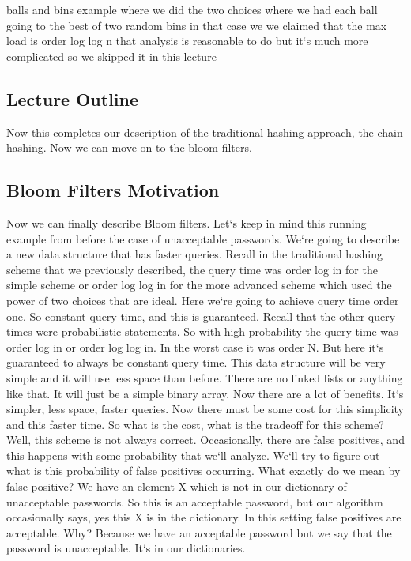 balls and bins example where we did the two choices where we had each ball going to the best of two random bins in that case we we claimed that the max load is order log log n that analysis is reasonable to do but it`s much more complicated so we skipped it in this lecture

\subsection{Lecture Outline}
Now this completes our description of the traditional hashing approach, the chain hashing.
Now we can move on to the bloom filters.

\subsection{Bloom Filters  Motivation}
Now we can finally describe Bloom filters.
Let`s keep in mind this running example from before the case of unacceptable passwords.
We`re going to describe a new data structure that has faster queries.
Recall in the traditional hashing scheme that we previously described, the query time was order log in for the simple scheme or order log log in for the more advanced scheme which used the power of two choices that are ideal.
Here we`re going to achieve query time order one.
So constant query time, and this is guaranteed.
Recall that the other query times were probabilistic statements.
So with high probability the query time was order log in or order log log in.
In the worst case it was order N\@.
But here it`s guaranteed to always be constant query time.
This data structure will be very simple and it will use less space than before.
There are no linked lists or anything like that.
It will just be a simple binary array.
Now there are a lot of benefits.
It`s simpler, less space, faster queries.
Now there must be some cost for this simplicity and this faster time.
So what is the cost, what is the tradeoff for this scheme? Well, this scheme is not always correct.
Occasionally, there are false positives, and this happens with some probability that we`ll analyze.
We`ll try to figure out what is this probability of false positives occurring.
What exactly do we mean by false positive? We have an element X which is not in our dictionary of unacceptable passwords.
So this is an acceptable password, but our algorithm occasionally says, yes this X is in the dictionary.
In this setting false positives are acceptable.
Why? Because we have an acceptable password but we say that the password is unacceptable.
It`s in our dictionaries.
